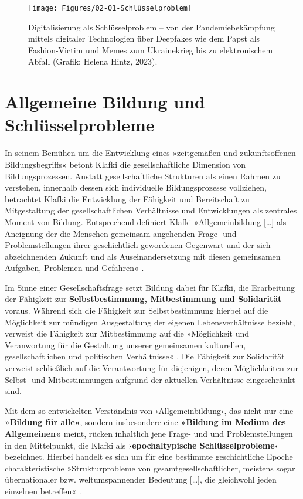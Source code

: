 \documentclass[
  a4paper,
]{book}
\begin{document}
\begin{figure}

{\centering \texttt{[image: Figures/02-01-Schlüsselproblem]} 

}

\caption{Digitalisierung als Schlüsselproblem – von der Pandemiebekämpfung mittels digitaler Technologien über Deepfakes wie dem Papst als Fashion-Victim und Memes zum Ukrainekrieg bis zu elektronischem Abfall (Grafik: Helena Hintz, 2023).}\label{fig:fig2}
\end{figure}

\section{Allgemeine Bildung und Schlüsselprobleme}\label{allgemeine-bildung-und-schluxfcsselprobleme}

In seinem Bemühen um die Entwicklung eines »zeitgemäßen und zukunftsoffenen Bildungsbegriffs« \citep[S. 49]{klafkiNeueStudienZur2007} betont Klafki die gesellschaftliche Dimension von Bildungsprozessen. Anstatt gesellschaftliche Strukturen als einen Rahmen zu verstehen, innerhalb dessen sich individuelle Bildungsprozesse vollziehen, betrachtet Klafki die Entwicklung der Fähigkeit und Bereitschaft zu Mitgestaltung der gesellschaftlichen Verhältnisse und Entwicklungen als zentrales Moment von Bildung. Entsprechend definiert Klafki »Allgemeinbildung {[}\ldots{]} als Aneignung der die Menschen gemeinsam angehenden Frage- und Problemstellungen ihrer geschichtlich gewordenen Gegenwart und der sich abzeichnenden Zukunft und als Auseinandersetzung mit diesen gemeinsamen Aufgaben, Problemen und Gefahren« \citep[S. 53]{klafkiNeueStudienZur2007}.

Im Sinne einer Gesellschaftsfrage setzt Bildung dabei für Klafki, die Erarbeitung der Fähigkeit zur \textbf{Selbstbestimmung, Mitbestimmung und Solidarität} voraus. Während sich die Fähigkeit zur Selbstbestimmung hierbei auf die Möglichkeit zur mündigen Ausgestaltung der eigenen Lebensverhältnisse bezieht, verweist die Fähigkeit zur Mitbestimmung auf die »Möglichkeit und Veranwortung für die Gestaltung unserer gemeinsamen kulturellen, gesellschaftlichen und politischen Verhältnisse« \citep[S. 52]{klafkiNeueStudienZur2007}. Die Fähigkeit zur Solidarität verweist schließlich auf die Verantwortung für diejenigen, deren Möglichkeiten zur Selbst- und Mitbestimmungen aufgrund der aktuellen Verhältnisse eingeschränkt sind.

Mit dem so entwickelten Verständnis von ›Allgemeinbildung‹, das nicht nur eine \textbf{»Bildung für alle«}, sondern insbesondere eine \textbf{»Bildung im Medium des Allgemeinen«} \citep[S. 53]{klafkiNeueStudienZur2007} meint, rücken inhaltlich jene Frage- und und Problemstellungen in den Mittelpunkt, die Klafki als \textbf{›epochaltypische Schlüsselprobleme‹} bezeichnet. Hierbei handelt es sich um für eine bestimmte geschichtliche Epoche charakteristische »Strukturprobleme von gesamtgesellschaftlicher, meistens sogar übernationaler bzw. weltumspannender Bedeutung {[}\ldots{]}, die gleichwohl jeden einzelnen betreffen« \citep[S. 60]{klafkiNeueStudienZur2007}.
\end{document}

